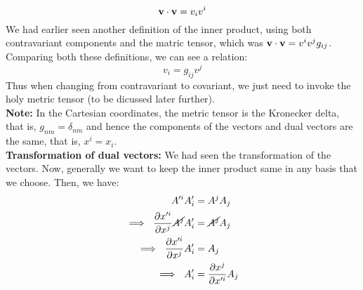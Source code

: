 $$\boldsymbol{\mathbf{v}}\cdot\boldsymbol{\mathbf{v}} = v_i v^i $$
\noindent
We had earlier seen another definition of the inner product, using both contravariant components and the matric tensor, which was $\boldsymbol{\mathbf{v}}\cdot\boldsymbol{\mathbf{v}} = v^i v^j g_{ij}$. Comparing both these definitions, we can see a relation:
$$v_i = g_{ij} v^j$$
Thus when changing from contravariant to covariant, we just need to invoke the holy metric tensor (to be dicussed later further).\\[0.3cm]
\noindent
\textbf{Note:} In the Cartesian coordinates, the metric tensor is the Kronecker delta, that is, $g_{nm} = \delta_{nm}$ and hence the components of the vectors and dual vectors are the same, that is, $x^i = x_i$. \\[0.3cm]
\textbf{Transformation of dual vectors:}
We had seen the transformation of the vectors. Now, generally we want to keep the inner product same in any basis that we choose. Then, we have:
\begin{align*}
    A'^iA'_i &= A^j A_j\\
  \implies\  \pdv{x'^i}{x^j}\cancel{ A^j} A'_i &= \cancel{A^j} A_j\\
   \implies\ \pdv{x'^i}{x^j} A'_i &= A_j \\
   \implies\ A'_i &= \pdv{x^j}{x'^i} A_j
\end{align*}